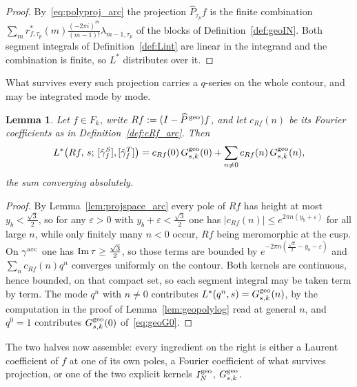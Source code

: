 \documentclass[11pt]{article}
\newtheorem{lemma}[theorem]{Lemma}
\begin{document}
\begin{proof}
By~\eqref{eq:polyproj_arc} the projection $\widehat P_{\tau_p}f$ is the finite combination
$\sum_{m}r^*_{f,\tau_p}(m)\frac{(-2\pi i)^{m}}{(m-1)!}\lambda_{m-1,\tau_p}$ of the blocks of
Definition~\ref{def:geoIN}. Both segment integrals of Definition~\ref{def:Lint} are linear in the
integrand and the combination is finite, so $L^*$ distributes over it.
\end{proof}

What survives every such projection carries a $q$-series on the whole contour, and may be
integrated mode by mode.

\begin{lemma}\label{lem:geotail}
Let $f\in F_k$, write $Rf:=(I-\widehat P^{\,\rm geo})f$, and let $c_{Rf}(n)$ be its Fourier
coefficients as in Definition~\ref{def:cRf_arc}. Then
\begin{equation}\label{eq:geotail}
L^*\big(Rf,\,s;\,[\hat\gamma^S_f],[\hat\gamma^T_f]\big)
=c_{Rf}(0)\,G^{\rm geo}_{s,k}(0)+\sum_{n\ne0}c_{Rf}(n)\,G^{\rm geo}_{s,k}(n),
\end{equation}
the sum converging absolutely.
\end{lemma}

\begin{proof}
By Lemma~\ref{lem:projspace_arc} every pole of $Rf$ has height at most
$y_b<\tfrac{\sqrt3}{2}$, so for any $\varepsilon>0$ with $y_b+\varepsilon<\tfrac{\sqrt3}{2}$ one
has $|c_{Rf}(n)|\le e^{2\pi n(y_b+\varepsilon)}$ for all large $n$, while only finitely many
$n<0$ occur, $Rf$ being meromorphic at the cusp. On $\gamma^{\rm arc}$ one has
${\rm Im}\,\tau\ge\tfrac{\sqrt3}{2}$, so those terms are bounded by
$e^{-2\pi n(\frac{\sqrt3}{2}-y_b-\varepsilon)}$ and $\sum_n c_{Rf}(n)q^{n}$ converges uniformly on
the contour. Both kernels are continuous, hence bounded, on that compact set, so each segment
integral may be taken term by term. The mode $q^{n}$ with $n\ne0$ contributes
$L^*(q^{n},s)=G^{\rm geo}_{s,k}(n)$, by the computation in the proof of
Lemma~\ref{lem:geopolylog} read at general $n$, and $q^{0}=1$ contributes
$G^{\rm geo}_{s,k}(0)$ of~\eqref{eq:geoG0}.
\end{proof}

The two halves now assemble: every ingredient on the right is either a Laurent coefficient of $f$
at one of its own poles, a Fourier coefficient of what survives projection, or one of the two
explicit kernels $I^{\rm geo}_N$, $G^{\rm geo}_{s,k}$.
\end{document}
